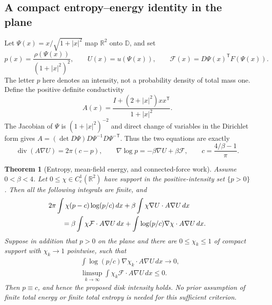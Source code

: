 \documentclass[11pt,a4paper]{article}
\numberwithin{equation}{section}
\newtheorem{theorem}{Theorem}[section]
\theoremstyle{definition}
\theoremstyle{remark}
\newcommand{\D}{\mathbb D}
\begin{document}
\subsection{A compact entropy--energy identity in the plane}

Let $\Psi(x)=x/\sqrt{1+|x|^2}$ map $\mathbb R^2$ onto $\D$, and set
\[
 p(x)=\frac{\rho(\Psi(x))}{(1+|x|^2)^2},\qquad
 U(x)=u(\Psi(x)),\qquad
 \mathcal F(x)=D\Psi(x)^{\mathsf T}F(\Psi(x)).
\]
The letter $p$ here denotes an intensity, not a probability density
of total mass one. Define the positive definite conductivity
\[
 A(x)=\frac{I+(2+|x|^2)xx^{\mathsf T}}{1+|x|^2}.
\]
The Jacobian of $\Psi$ is $(1+|x|^2)^{-2}$ and direct change of
variables in the Dirichlet form gives
$A=(\det D\Psi)D\Psi^{-1}D\Psi^{-\mathsf T}$. Thus the two equations
are exactly
\begin{equation}
 \operatorname{div}(A\nabla U)=2\pi(c-p),\qquad
 \nabla\log p=-\beta\nabla U+\beta\mathcal F,
 \qquad c=\frac{4/\beta-1}{\pi}.
 \label{eq:screening-plane-coupled-equations}
\end{equation}

\begin{theorem}[Entropy, mean-field energy, and connected-force work]
\label{thm:screening-entropy-energy}
Assume $0<\beta<4$. Let $0\le\chi\in C_c^1(\mathbb R^2)$ have
support in the positive-intensity set $\{p>0\}$. Then all the following
integrals are finite, and
\begin{align}
 &2\pi\int\chi(p-c)\log(p/c)\,dx
       +\beta\int\chi\nabla U\cdot A\nabla U\,dx\notag\\
 &\qquad=\beta\int\chi\mathcal F\cdot A\nabla U\,dx
       +\int\log(p/c)\nabla\chi\cdot A\nabla U\,dx.
 \label{eq:screening-compact-entropy-energy}
\end{align}
Suppose in addition that $p>0$ on the plane and there are
$0\le\chi_k\le1$ of compact support with $\chi_k\to1$ pointwise,
such that
\begin{align}
 &\int\log(p/c)\nabla\chi_k\cdot A\nabla U\,dx\longrightarrow0,
 \label{eq:screening-cutoff-boundary-condition}\\
 &\limsup_{k\to\infty}
       \int\chi_k\mathcal F\cdot A\nabla U\,dx\le0.
 \label{eq:screening-connected-work-sign}
\end{align}
Then $p\equiv c$, and hence the proposed disk intensity holds.
No prior assumption of finite total energy or finite total entropy is
needed for this sufficient criterion.
\end{theorem}
\end{document}
